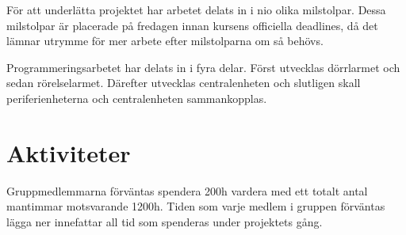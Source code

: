 \documentclass[a4paper]{article}
\begin{document}
För att underlätta projektet har arbetet delats in i nio olika milstolpar. Dessa milstolpar är placerade på fredagen innan kursens officiella deadlines, då det lämnar utrymme för mer arbete efter milstolparna om så behövs. 

Programmeringsarbetet har delats in i fyra delar. Först utvecklas dörrlarmet och sedan rörelselarmet. Därefter utvecklas centralenheten och slutligen skall periferienheterna och centralenheten sammankopplas. 

\section{Aktiviteter}

Gruppmedlemmarna förväntas spendera 200h vardera med ett totalt antal mantimmar motsvarande 1200h. Tiden som varje medlem i gruppen förväntas lägga ner innefattar all tid som spenderas under projektets gång.
\end{document}
